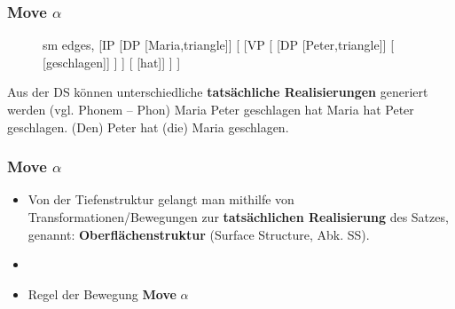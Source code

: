 \begin{frame}
\frametitle{Move $\alpha$}

\begin{figure}[b]
  	\begin{minipage}[b]{0.70\textwidth}
	\centering
	\scriptsize{
		\begin{forest}
		sm edges,
		[IP [DP [Maria,triangle]]
			[ 
				[VP 
					[ 
						[DP [Peter,triangle]]
						[ [geschlagen]]
					]
				]
				[ [hat]]
			]
		]
		\end{forest}
		}
  	\end{minipage}  
\end{figure}

Aus der DS können unterschiedliche \textbf{tatsächliche Realisierungen} generiert werden (vgl. Phonem -- Phon)
\eal
\ex Maria Peter geschlagen hat
\ex Maria hat Peter geschlagen.
\ex (Den) Peter hat (die) Maria geschlagen.
\zl

\end{frame}


\begin{frame}
\frametitle{Move $\alpha$}

\begin{itemize}
	\item Von der Tiefenstruktur gelangt man mithilfe von Transformationen/Bewegungen zur \textbf{tatsächlichen Realisierung} des Satzes, genannt: \textbf{Oberflächenstruktur} (Surface Structure, Abk. SS).
	\item[]
	\item Regel der Bewegung \ras \textbf{Move} $\alpha$
\end{itemize}

\end{frame}


